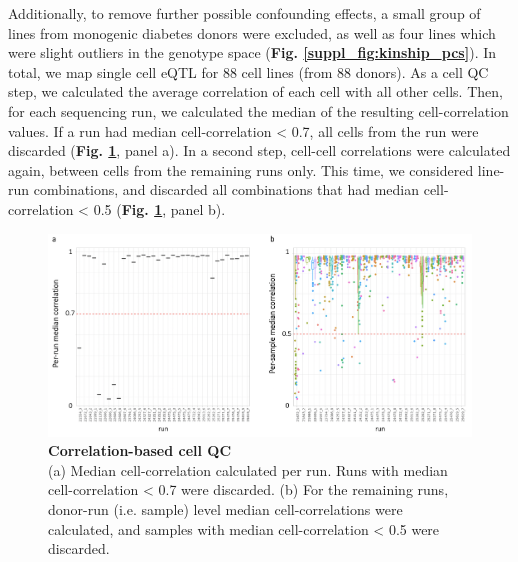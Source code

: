 
Additionally, to remove further possible confounding effects, a small group of lines from monogenic diabetes donors were excluded, as well as four lines which were slight outliers in the genotype space (\textbf{Fig. \ref{suppl_fig:kinship_pcs}}).
In total, we map single cell eQTL for 88 cell lines (from 88 donors).
As a cell QC step, we calculated the average correlation of each cell with all other cells.
Then, for each sequencing run, we calculated the median of the resulting cell-correlation values.
If a run had median cell-correlation < 0.7, all cells from the run were discarded (\textbf{Fig. \ref{fig:sc_eqtl_autocorrelation}}, panel a).
In a second step, cell-cell correlations were calculated again, between cells from the remaining runs only.
This time, we considered line-run combinations, and discarded all combinations that had median cell-correlation < 0.5 (\textbf{Fig. \ref{fig:sc_eqtl_autocorrelation}}, panel b). \\

\begin{figure}[h]
\centering
\includegraphics[width=15cm]{Chapter3/Fig/sc_eqtl_cell_QC.png}
\caption[Correlation-based cell QC]{\textbf{Correlation-based cell QC}\\
(a) Median cell-correlation calculated per run.
Runs with median cell-correlation < 0.7 were discarded.
(b) For the remaining runs, donor-run (i.e. sample) level median cell-correlations were calculated, and samples with median cell-correlation < 0.5 were discarded.}
\label{fig:sc_eqtl_autocorrelation}
\end{figure}

